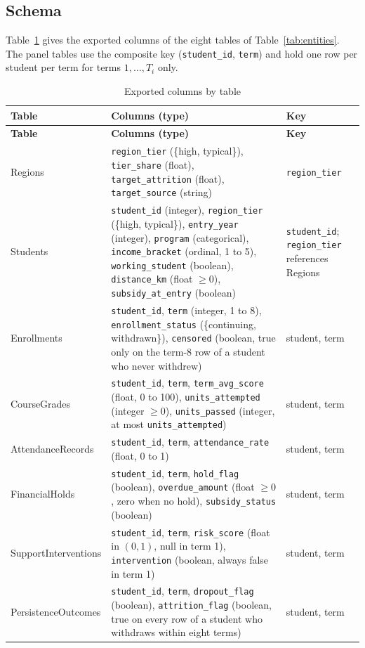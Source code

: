 \documentclass[11pt]{article}
\begin{document}
\subsection{Schema}

Table~\ref{tab:schema} gives the exported columns of the eight tables of Table~\ref{tab:entities}. The panel tables use the composite key (\texttt{student\_id}, \texttt{term}) and hold one row per student per term for terms $1,\ldots,T_i$ only.

{\small
\begin{longtable}{@{}p{}p{}p{}@{}}
\caption{Exported columns by table}\label{tab:schema}\\
\toprule
\textbf{Table} & \textbf{Columns (type)} & \textbf{Key} \\
\midrule
\endfirsthead
\toprule
\textbf{Table} & \textbf{Columns (type)} & \textbf{Key} \\
\midrule
\endhead
\bottomrule
\endfoot
Regions & \texttt{region\_tier} (\{high, typical\}), \texttt{tier\_share} (float), \texttt{target\_attrition} (float), \texttt{target\_source} (string) & \texttt{region\_tier} \\
\addlinespace
Students & \texttt{student\_id} (integer), \texttt{region\_tier} (\{high, typical\}), \texttt{entry\_year} (integer), \texttt{program} (categorical), \texttt{income\_bracket} (ordinal, 1 to 5), \texttt{working\_student} (boolean), \texttt{distance\_km} (float $\ge 0$), \texttt{subsidy\_at\_entry} (boolean) & \texttt{student\_id}; \texttt{region\_tier} references Regions \\
\addlinespace
Enrollments & \texttt{student\_id}, \texttt{term} (integer, 1 to 8), \texttt{enrollment\_status} (\{continuing, withdrawn\}), \texttt{censored} (boolean, true only on the term-8 row of a student who never withdrew) & student, term \\
\addlinespace
CourseGrades & \texttt{student\_id}, \texttt{term}, \texttt{term\_avg\_score} (float, 0 to 100), \texttt{units\_attempted} (integer $\ge 0$), \texttt{units\_passed} (integer, at most \texttt{units\_attempted}) & student, term \\
\addlinespace
AttendanceRecords & \texttt{student\_id}, \texttt{term}, \texttt{attendance\_rate} (float, 0 to 1) & student, term \\
\addlinespace
FinancialHolds & \texttt{student\_id}, \texttt{term}, \texttt{hold\_flag} (boolean), \texttt{overdue\_amount} (float $\ge 0$, zero when no hold), \texttt{subsidy\_status} (boolean) & student, term \\
\addlinespace
SupportInterventions & \texttt{student\_id}, \texttt{term}, \texttt{risk\_score} (float in $(0,1)$, null in term 1), \texttt{intervention} (boolean, always false in term 1) & student, term \\
\addlinespace
PersistenceOutcomes & \texttt{student\_id}, \texttt{term}, \texttt{dropout\_flag} (boolean), \texttt{attrition\_flag} (boolean, true on every row of a student who withdraws within eight terms) & student, term \\
\end{longtable}
}
\end{document}
